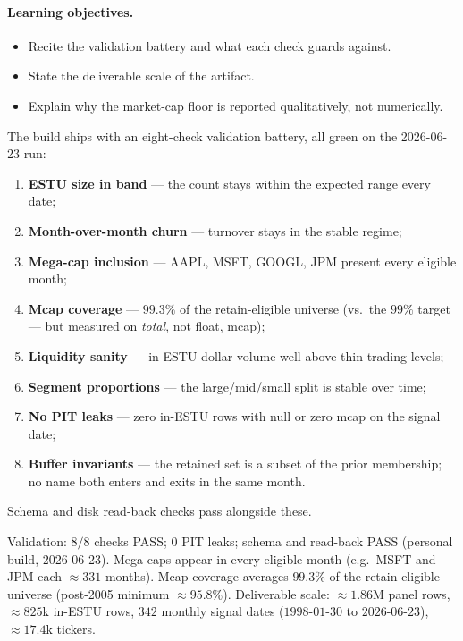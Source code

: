 \documentclass[11pt]{article}
\theoremstyle{definition}
\theoremstyle{plain}
\theoremstyle{remark}
\begin{document}
\paragraph{Learning objectives.}
\begin{itemize}[nosep,leftmargin=1.4em]
  \item Recite the validation battery and what each check guards against.
  \item State the deliverable scale of the artifact.
  \item Explain why the market-cap floor is reported qualitatively, not numerically.
\end{itemize}

The build ships with an eight-check validation battery, all green on the 2026-06-23 run:
\begin{enumerate}[nosep,leftmargin=1.6em]
  \item \textbf{ESTU size in band} --- the count stays within the expected range every date;
  \item \textbf{Month-over-month churn} --- turnover stays in the stable regime;
  \item \textbf{Mega-cap inclusion} --- AAPL, MSFT, GOOGL, JPM present every eligible month;
  \item \textbf{Mcap coverage} --- $99.3\%$ of the retain-eligible universe (vs.\ the $99\%$ target --- but measured on \emph{total}, not float, mcap);
  \item \textbf{Liquidity sanity} --- in-ESTU dollar volume well above thin-trading levels;
  \item \textbf{Segment proportions} --- the large/mid/small split is stable over time;
  \item \textbf{No PIT leaks} --- zero in-ESTU rows with null or zero mcap on the signal date;
  \item \textbf{Buffer invariants} --- the retained set is a subset of the prior membership; no name both enters and exits in the same month.
\end{enumerate}
Schema and disk read-back checks pass alongside these.

\begin{observed}
Validation: $8/8$ checks PASS; $0$ PIT leaks; schema and read-back PASS (personal build, 2026-06-23). Mega-caps appear in every eligible month (e.g.\ MSFT and JPM each $\approx 331$ months). Mcap coverage averages $99.3\%$ of the retain-eligible universe (post-2005 minimum $\approx 95.8\%$). Deliverable scale: $\approx 1.86$M panel rows, $\approx 825$k in-ESTU rows, $342$ monthly signal dates ($1998$-$01$-$30$ to $2026$-$06$-$23$), $\approx 17.4$k tickers.
\end{observed}
\end{document}
